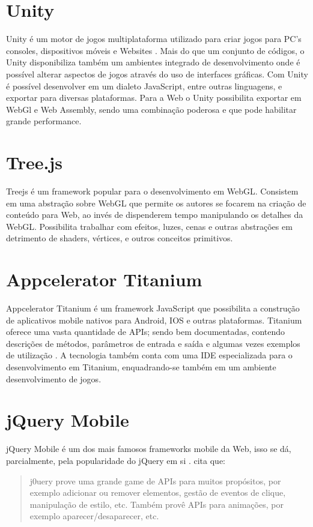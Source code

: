 \section{Unity}

Unity é um motor de jogos multiplataforma utilizado para criar jogos
para PC's consoles, dispositivos móveis e Websites \autocite{unity}.
Mais do que um conjunto de códigos, o Unity disponibiliza também
um ambientes integrado de desenvolvimento onde é possível alterar
aspectos de jogos através do uso de interfaces gráficas. Com Unity é possível
desenvolver em um dialeto JavaScript, entre outras linguagens, e
exportar para diversas plataformas. Para a Web o Unity possibilita
exportar em WebGl e Web Assembly, sendo uma combinação poderosa e que
pode habilitar grande performance.

\section{Tree.js}

Treejs é um framework popular para o desenvolvimento em WebGL.
Consistem em uma abstração sobre WebGL que permite os autores se
focarem na criação de conteúdo para Web, ao invés de dispenderem
tempo manipulando os detalhes da WebGL. Possibilita trabalhar com
efeitos, luzes, cenas e outras abstrações em detrimento de shaders,
vértices, e outros conceitos primitivos.

\section{Appcelerator Titanium}

Appcelerator Titanium é um framework JavaScript que possibilita a
construção de aplicativos mobile nativos para Android, IOS e outras
plataformas. Titanium oferece uma vasta quantidade de APIs; sendo
bem documentadas, contendo descrições de métodos, parâmetros de
entrada e saída e algumas vezes exemplos de utilização \autocite[p.
2]{crossPlatformAppsAnimations}. A tecnologia também conta com uma IDE
especializada para o desenvolvimento em Titanium, enquadrando-se também
em um ambiente desenvolvimento de jogos.

\section{jQuery Mobile}

jQuery Mobile é um dos mais famosos frameworks mobile da Web,
isso se dá, parcialmente, pela popularidade do jQuery em si
\autocite[p. 14]{viabilityBusinessApplications}. \citet[p.
2]{crossPlatformAppsAnimations} cita que:
\begin{quote}
j0uery prove uma grande game de APIs para muitos propósitos, por
exemplo adicionar ou remover elementos, gestão de eventos de clique,
manipulação de estilo, etc. Também provê APIs para animações, por
exemplo aparecer/desaparecer, etc.
\end{quote}


